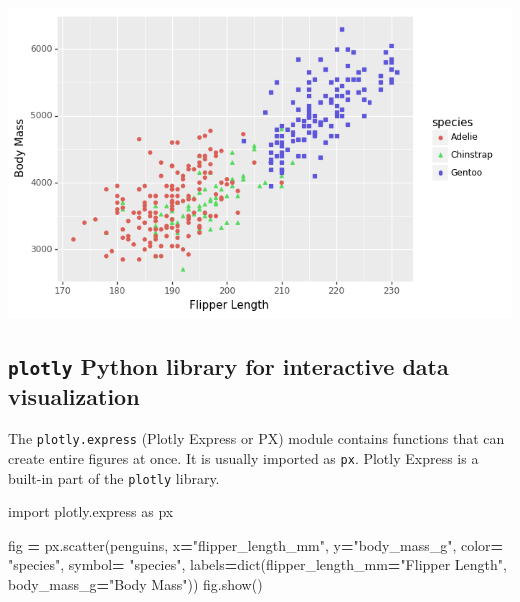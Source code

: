 \documentclass[
]{book}
\newenvironment{Shaded}{\begin{snugshade}}{\end{snugshade}}
\newcommand{\BuiltInTok}[1]{#1}
\newcommand{\ImportTok}[1]{#1}
\newcommand{\NormalTok}[1]{#1}
\newcommand{\OperatorTok}[1]{\textcolor[rgb]{0.81,0.36,0.00}{\textbf{#1}}}
\newcommand{\StringTok}[1]{\textcolor[rgb]{0.31,0.60,0.02}{#1}}
\begin{document}
\begin{center}\includegraphics[width=0.9\linewidth]{fig/Viz_chap/3_plotnine} \end{center}

\hypertarget{plotly-python-library-for-interactive-data-visualization}{%
\subsection{\texorpdfstring{\texttt{plotly} Python library for interactive data visualization}{plotly Python library for interactive data visualization}}\label{plotly-python-library-for-interactive-data-visualization}}

The \texttt{plotly.express} (Plotly Express or PX) module contains functions that can create entire figures at once. It is usually imported as \texttt{px}. Plotly Express is a built-in part of the \texttt{plotly} library.

\begin{Shaded}
\begin{Highlighting}[]
\ImportTok{import}\NormalTok{ plotly.express }\ImportTok{as}\NormalTok{ px}

\NormalTok{fig }\OperatorTok{=}\NormalTok{ px.scatter(penguins,}
\NormalTok{                 x}\OperatorTok{=}\StringTok{"flipper\_length\_mm"}\NormalTok{,}
\NormalTok{                 y}\OperatorTok{=}\StringTok{"body\_mass\_g"}\NormalTok{,}
\NormalTok{                 color}\OperatorTok{=} \StringTok{"species"}\NormalTok{,}
\NormalTok{                 symbol}\OperatorTok{=} \StringTok{"species"}\NormalTok{,}
\NormalTok{                 labels}\OperatorTok{=}\BuiltInTok{dict}\NormalTok{(flipper\_length\_mm}\OperatorTok{=}\StringTok{"Flipper Length"}\NormalTok{,}
\NormalTok{                             body\_mass\_g}\OperatorTok{=}\StringTok{"Body Mass"}\NormalTok{))}
\NormalTok{fig.show()}
\end{Highlighting}
\end{Shaded}
\end{document}
